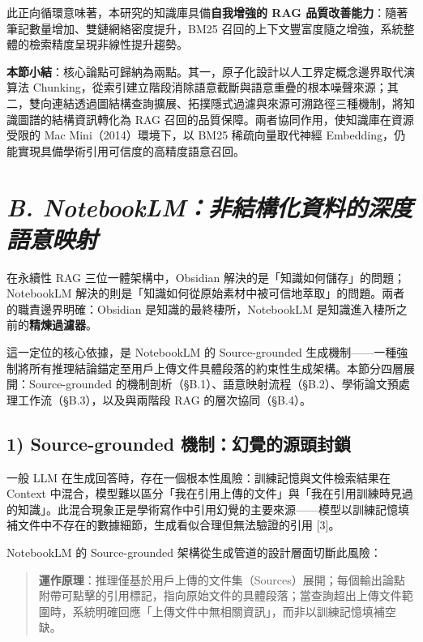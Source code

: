 此正向循環意味著，本研究的知識庫具備\textbf{自我增強的 RAG
品質改善能力}：隨著筆記數量增加、雙鏈網絡密度提升，BM25
召回的上下文豐富度隨之增強，系統整體的檢索精度呈現非線性提升趨勢。

\textbf{本節小結}：核心論點可歸納為兩點。其一，原子化設計以人工界定概念邊界取代演算法
Chunking，從索引建立階段消除語意截斷與語意重疊的根本噪聲來源；其二，雙向連結透過圖結構查詢擴展、拓撲隱式過濾與來源可溯路徑三種機制，將知識圖譜的結構資訊轉化為
RAG 召回的品質保障。兩者協同作用，使知識庫在資源受限的 Mac
Mini（2014）環境下，以 BM25 稀疏向量取代神經
Embedding，仍能實現具備學術引用可信度的高精度語意召回。

\section{\texorpdfstring{\emph{B.
NotebookLM：非結構化資料的深度語意映射}}{B. NotebookLM：非結構化資料的深度語意映射}}\label{b.-notebooklmux975eux7d50ux69cbux5316ux8cc7ux6599ux7684ux6df1ux5ea6ux8a9eux610fux6620ux5c04}

在永續性 RAG 三位一體架構中，Obsidian
解決的是「知識如何儲存」的問題；NotebookLM
解決的則是「知識如何從原始素材中被可信地萃取」的問題。兩者的職責邊界明確：Obsidian
是知識的最終棲所，NotebookLM 是知識進入棲所之前的\textbf{精煉過濾器}。

這一定位的核心依據，是 NotebookLM 的 Source-grounded
生成機制------一種強制將所有推理結論錨定至用戶上傳文件具體段落的約束性生成架構。本節分四層展開：Source-grounded
的機制剖析（§B.1）、語意映射流程（§B.2）、學術論文預處理工作流（§B.3），以及與兩階段
RAG 的層次協同（§B.4）。

\subsection{1) Source-grounded
機制：幻覺的源頭封鎖}\label{source-grounded-ux6a5fux5236ux5e7bux89baux7684ux6e90ux982dux5c01ux9396}

一般 LLM 在生成回答時，存在一個根本性風險：訓練記憶與文件檢索結果在
Context
中混合，模型難以區分「我在引用上傳的文件」與「我在引用訓練時見過的知識」。此混合現象正是學術寫作中引用幻覺的主要來源------模型以訓練記憶填補文件中不存在的數據細節，生成看似合理但無法驗證的引用
{[}3{]}。

NotebookLM 的 Source-grounded 架構從生成管道的設計層面切斷此風險：

\begin{quote}
\textbf{運作原理}：推理僅基於用戶上傳的文件集（Sources）展開；每個輸出論點附帶可點擊的引用標記，指向原始文件的具體段落；當查詢超出上傳文件範圍時，系統明確回應「上傳文件中無相關資訊」，而非以訓練記憶填補空缺。
\end{quote}

